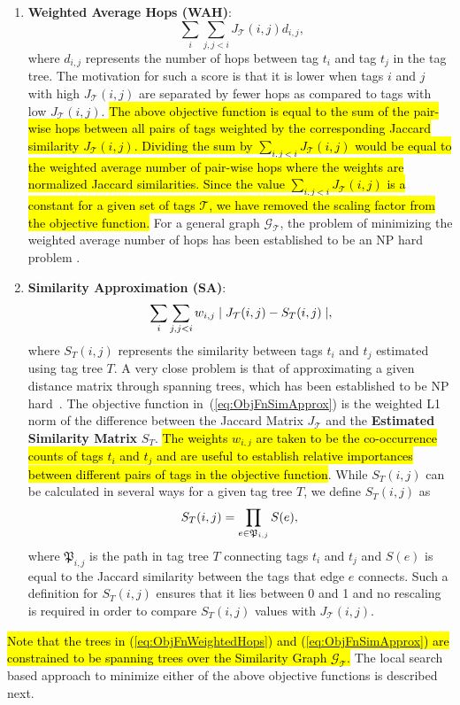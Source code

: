 \begin{enumerate}
\item \textbf{Weighted Average Hops (WAH)}: 
\begin{equation}
\; \sum_i\sum_{j, j < i}{J_{\mathcal{T}}(i,j)d_{i,j}} , 
\label{eq:ObjFnWeightedHops}
\end{equation}
where $d_{i,j}$ represents the number of hops between tag $t_i$ and tag $t_j$ in the tag tree. The motivation for such a score is that it is lower when tags $i$ and $j$ with high $J_{\mathcal{T}}(i,j)$ are separated by fewer hops as compared to tags with low $J_{\mathcal{T}}(i,j)$. \hl{The above objective function is equal to the sum of the pair-wise hops between all pairs of tags weighted by the corresponding Jaccard similarity {$J_{\mathcal{T}}(i,j)$}. Dividing the sum by 
$\sum_{i,j < i}{J_{\mathcal{T}}(i,j)}$ would be equal to the weighted average number of pair-wise hops where the weights are normalized Jaccard similarities. Since the value $\sum_{i,j <  i} {J_{\mathcal{T}}(i,j)}$ is a constant for a given set of tags {$\mathcal{T}$}, we have removed the scaling factor from the objective function. }
For a general graph $\mathcal{G_T}$, the problem of minimizing the weighted average number of hops has been established to be an NP hard problem \cite{garey1979computers}.  
\item \textbf{Similarity Approximation (SA)}: 
\begin{equation}
\; \sum_i\sum_{j, j < i}{w_{i,j}\mid J_{\mathcal{T}}(i,j) - S_T{(i,j)}} \mid  , \\
\label{eq:ObjFnSimApprox}
\end{equation}
where $S_T{(i,j)}$ represents the similarity between tags $t_i$ and $t_j$ estimated using tag tree $T$. A very close problem is that of approximating a given distance matrix through spanning trees, which has been established to be NP hard~\cite{eckhardt2005combinatorial}. The objective function in~(\ref{eq:ObjFnSimApprox}) is the weighted L1 norm of the difference between the Jaccard Matrix $J_{\mathcal{T}}$ and the \textbf{Estimated Similarity Matrix} $S_T$. \hl{The weights $w_{i,j}$ are taken to be the co-occurrence counts of tags $t_i$ and $t_j$ and are useful to establish relative importances between different pairs of tags in the objective function}. While $S_T{(i,j)}$ can be calculated in several ways for a given tag tree $T$, we define $S_T{(i,j)}$  as 
\begin{equation}
S_T{(i,j)} = \prod_{e \in \mathfrak{P}_{i,j}}{S(e)}  , \\
\label{eq:ProdSimSimilarityCalculate}
\end{equation}
where $\mathfrak{P}_{i,j}$ is the path in tag tree $T$ connecting tags $t_i$ and $t_j$ and $S(e)$ is equal to the Jaccard similarity between the tags that edge $e$ connects. Such a definition for $S_T{(i,j)}$  ensures that it lies between 0 and 1 and no rescaling is required in order to compare $S_T{(i,j)}$  values with $J_{\mathcal{T}}(i,j)$.
\end{enumerate}
\hl{Note that the trees in ({\ref{eq:ObjFnWeightedHops}}) and ({\ref{eq:ObjFnSimApprox}}) are constrained to be spanning trees over the Similarity Graph $\mathcal{G_T}$. }The local search based approach to minimize either of the above objective functions is described next. 
\vspace{-0.12in}